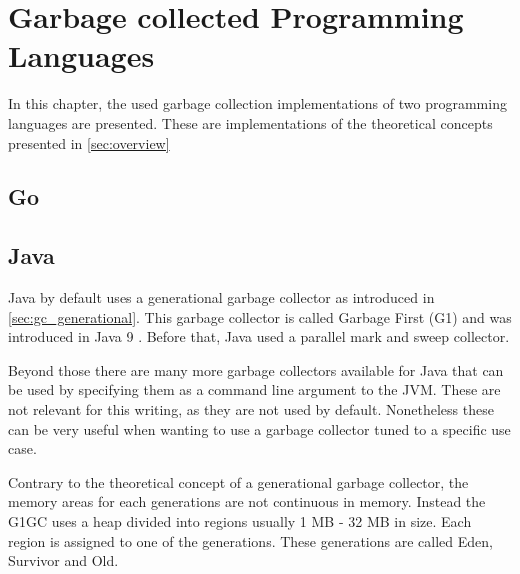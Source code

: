 \chapter{Garbage collected Programming Languages}

In this chapter, the used garbage collection implementations of two programming
languages are presented. These are implementations of the theoretical concepts
presented in \autoref{sec:overview}

\section{Go}
\section{Java}

Java by default uses a generational garbage collector as introduced in \autoref{sec:gc_generational}.
This garbage collector is called Garbage First (G1) and was introduced in Java 9 \cite{java_gc_comparison_2018}.
Before that, Java used a parallel mark and sweep collector.

Beyond those there are many more garbage collectors available for Java that can
be used by specifying them as a command line argument to the JVM.
These are not relevant for this writing, as they are not used by default.
Nonetheless these can be very useful when wanting to use a garbage collector
tuned to a specific use case.

Contrary to the theoretical concept of a generational garbage collector,
the memory areas for each generations are not continuous in memory.
Instead the G1GC uses a heap divided into regions usually 1 MB - 32 MB in size.
Each region is assigned to one of the generations.
These generations are called Eden, Survivor and Old. \cite{java_g1_getting_started}

